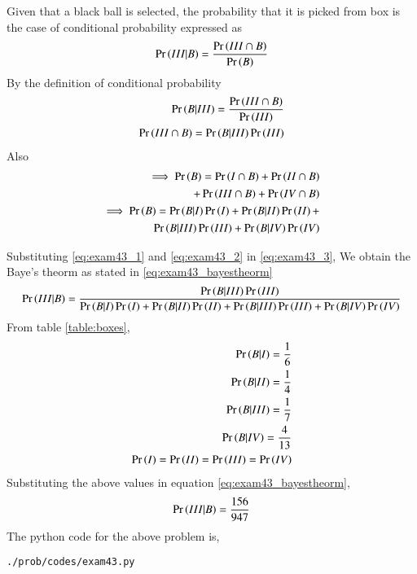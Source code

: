 Given that a black ball is selected, the probability that it is picked from box  is the case of conditional probability expressed as
\begin{align}
\pr{\RomanNumeralCaps{3}|B}=\frac{\pr{\RomanNumeralCaps{3} \cap B}}{\pr{B}}
\label{eq:exam43_3}
\end{align}
By the definition of conditional probability
\begin{align}
\pr{B|\RomanNumeralCaps{3}}=\frac{\pr{\RomanNumeralCaps{3} \cap B}}{\pr{\RomanNumeralCaps{3}}}
\\
\pr{\RomanNumeralCaps{3} \cap B} = \pr{B|\RomanNumeralCaps{3}}\pr{\RomanNumeralCaps{3}}
\label{eq:exam43_1}
\end{align}
Also 
\begin{align}
\implies \pr{B}=\pr{\RomanNumeralCaps{1} \cap B}+\pr{\RomanNumeralCaps{2} \cap B}
\\ +\pr{\RomanNumeralCaps{3} \cap B}+\pr{\RomanNumeralCaps{4} \cap B}
\\
\implies \pr{B} = \pr{B|\RomanNumeralCaps{1}} \pr{\RomanNumeralCaps{1}}+\pr{B|\RomanNumeralCaps{2}} \pr{\RomanNumeralCaps{2}}+
\\ \pr{B|\RomanNumeralCaps{3}} \pr{\RomanNumeralCaps{3}}+\pr{B|\RomanNumeralCaps{4}} \pr{\RomanNumeralCaps{4}}
\label{eq:exam43_2}
\end{align}

Substituting \eqref{eq:exam43_1} and \eqref{eq:exam43_2} in \eqref{eq:exam43_3}, We obtain the Baye's theorm as stated in \eqref{eq:exam43_bayestheorm}
\begin{align}
\pr{\RomanNumeralCaps{3}|B}= \frac{\pr{B|\RomanNumeralCaps{3}} \pr{\RomanNumeralCaps{3}}}{\pr{B|\RomanNumeralCaps{1}} \pr{\RomanNumeralCaps{1}}+\pr{B|\RomanNumeralCaps{2}} \pr{\RomanNumeralCaps{2}}+\pr{B|\RomanNumeralCaps{3}} \pr{\RomanNumeralCaps{3}}+\pr{B|\RomanNumeralCaps{4}} \pr{\RomanNumeralCaps{4}}}
\label{eq:exam43_bayestheorm}
\end{align}
From table \ref{table:boxes},
\begin{align}
\pr{B|\RomanNumeralCaps{1}} = \frac{1}{6}
\\
\pr{B|\RomanNumeralCaps{2}} = \frac{1}{4}
\\
\pr{B|\RomanNumeralCaps{3}} = \frac{1}{7}
\\
\pr{B|\RomanNumeralCaps{4}} = \frac{4}{13}
\\
\pr{\RomanNumeralCaps{1}}=\pr{\RomanNumeralCaps{2}}=\pr{\RomanNumeralCaps{3}}=\pr{\RomanNumeralCaps{4}}
\end{align}
Substituting the above values in equation \eqref{eq:exam43_bayestheorm},
\begin{align}
\pr{\RomanNumeralCaps{3}|B}=\frac{156}{947}
\end{align}
The python code for the above problem is,
\begin{lstlisting}
./prob/codes/exam43.py
\end{lstlisting}
